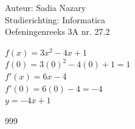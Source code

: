 \documentclass[a4paper]{article}
\begin{document}
\noindent\large Auteur: Sadia Nazary \\
\noindent\large Studierichting: Informatica \\
\noindent\large Oefeningenreeks 3A nr. 27.2 \\

\medskip

\normalsize

$f(x)=3x^2-4x+1$ \\

$f(0)=3(0)^2-4(0)+1=1$ \\

$f'(x)=6x-4$ \\

$f'(0)=6(0)-4=-4$ \\

$y=-4x+1$ \\

\begin{thebibliography}{999}
\end{thebibliography}
\end{document}
